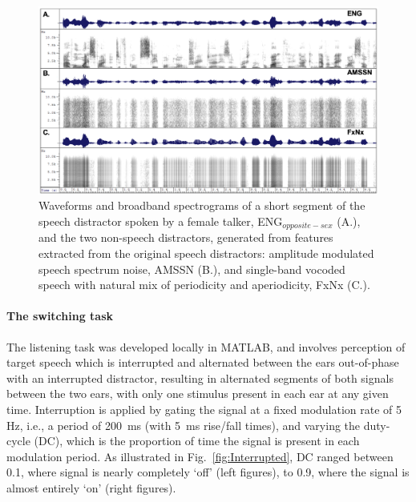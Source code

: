 \documentclass[a4paper, twoside]{templates/ociamthesis}
\begin{document}
\begin{figure}[ht]
\center
\includegraphics[width=\textwidth]{figures/Chapt1/MaskerType.PNG}
\caption{\label{fig:MaskerType}{Waveforms and broadband spectrograms of a short segment of the speech distractor spoken by a female talker, ENG$_{opposite-sex}$ (A.), and the two non-speech distractors, generated from features extracted from the original speech distractors: amplitude modulated speech spectrum noise, AMSSN (B.), and single-band vocoded speech with natural mix of periodicity and aperiodicity, FxNx (C.).}}
\end{figure}

\hypertarget{the-switching-task}{%
\paragraph{The switching task}\label{the-switching-task}}

\hfill\break
The listening task was developed locally in MATLAB, and involves perception of target speech which is interrupted and alternated between the ears out-of-phase with an interrupted distractor, resulting in alternated segments of both signals between the two ears, with only one stimulus present in each ear at any given time.
Interruption is applied by gating the signal at a fixed modulation rate of 5 Hz, i.e., a period of 200~ms (with 5~ms rise/fall times), and varying the duty-cycle (DC), which is the proportion of time the signal is present in each modulation period. As illustrated in Fig.~\ref{fig:Interrupted}, DC ranged between 0.1, where signal is nearly completely `off' (left figures), to 0.9, where the signal is almost entirely `on' (right figures).
\end{document}
